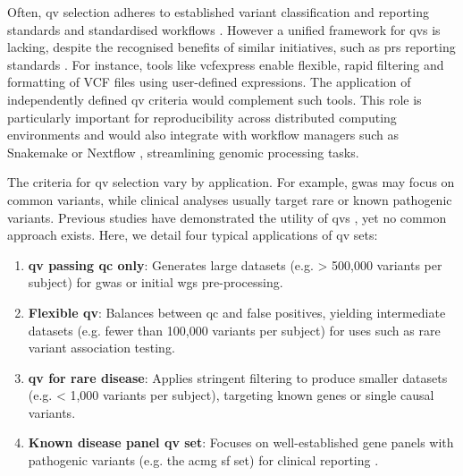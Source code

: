 Often, \ac{qv} selection adheres to established variant classification and reporting standards \cite{richards2015standards, li2017standards, li2017intervar, riggs2020technical, tavtigian2020fitting} and standardised workflows \cite{pedersen2021effective, anderson2010data, uffelmann2021genome}. 
However a unified framework for \ac{qv}s is lacking, despite the recognised benefits of similar initiatives, such as \ac{prs} reporting standards \cite{wand2021improving, lambert2021polygenic}.
For instance, tools like vcfexpress \cite{pedersen_vcfexpress_2025} enable flexible, rapid filtering and formatting of VCF files using user-defined expressions. The application of independently defined \ac{qv} criteria would complement such tools.
This role is particularly important for reproducibility across distributed computing environments \cite{bal_programming_1989} and would also integrate with workflow managers such as Snakemake \cite{molder_sustainable_2021} or Nextflow \cite{di_tommaso_nextflow_2017}, streamlining genomic processing tasks.

The criteria for \ac{qv} selection vary by application. 
For example, \ac{gwas} may focus on common variants, while clinical analyses usually target rare or known pathogenic variants. 
Previous studies have demonstrated the utility of \ac{qv}s \cite{povysil2019rare, cirulli2015exome}, yet no common approach exists. 
Here, we detail four typical applications of \ac{qv} sets:
\begin{enumerate}
    \item \textbf{\ac{qv} passing \ac{qc} only}: Generates large datasets (e.g. > 500,000 variants per subject) for \ac{gwas} or initial \ac{wgs} pre-processing.
    \item \textbf{Flexible \ac{qv}}: Balances between \ac{qc} and false positives, yielding intermediate datasets (e.g. fewer than 100,000 variants per subject) for uses such as rare variant association testing.
    \item \textbf{\ac{qv} for rare disease}: Applies stringent filtering to produce smaller datasets (e.g. < 1,000 variants per subject), targeting known genes or single causal variants.
    \item \textbf{Known disease panel \ac{qv} set}: Focuses on well-established gene panels with pathogenic variants (e.g. the \ac{acmg} \ac{sf} set) for clinical reporting \cite{miller2023acmg}.
\end{enumerate}

